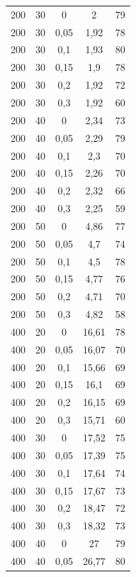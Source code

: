 \documentclass{article}
\begin{document}
\begin{longtable}{c|c|c|c|c}
200    & 30   & 0     & 2       & 79    \\
200    & 30   & 0,05  & 1,92    & 78    \\
200    & 30   & 0,1   & 1,93    & 80    \\
200    & 30   & 0,15  & 1,9     & 78    \\
200    & 30   & 0,2   & 1,92    & 72    \\
200    & 30   & 0,3   & 1,92    & 60    \\
200    & 40   & 0     & 2,34    & 73    \\
200    & 40   & 0,05  & 2,29    & 79    \\
200    & 40   & 0,1   & 2,3     & 70    \\
200    & 40   & 0,15  & 2,26    & 70    \\
200    & 40   & 0,2   & 2,32    & 66    \\
200    & 40   & 0,3   & 2,25    & 59    \\
200    & 50   & 0     & 4,86    & 77    \\
200    & 50   & 0,05  & 4,7     & 74    \\
200    & 50   & 0,1   & 4,5     & 78    \\
200    & 50   & 0,15  & 4,77    & 76    \\
200    & 50   & 0,2   & 4,71    & 70    \\
200    & 50   & 0,3   & 4,82    & 58    \\
400    & 20   & 0     & 16,61   & 78    \\
400    & 20   & 0,05  & 16,07   & 70    \\
400    & 20   & 0,1   & 15,66   & 69    \\
400    & 20   & 0,15  & 16,1    & 69    \\
400    & 20   & 0,2   & 16,15   & 69    \\
400    & 20   & 0,3   & 15,71   & 60    \\
400    & 30   & 0     & 17,52   & 75    \\
400    & 30   & 0,05  & 17,39   & 75    \\
400    & 30   & 0,1   & 17,64   & 74    \\
400    & 30   & 0,15  & 17,67   & 73    \\
400    & 30   & 0,2   & 18,47   & 72    \\
400    & 30   & 0,3   & 18,32   & 73    \\
400    & 40   & 0     & 27      & 79    \\
400    & 40   & 0,05  & 26,77   & 80    \\

\end{longtable}
\end{document}
